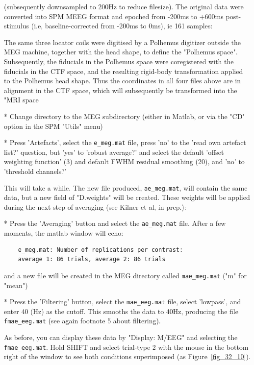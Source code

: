  (subsequently downsampled to 200Hz to reduce filesize).  The original data were converted into SPM MEEG format and epoched from -200ms to +600ms post-stimulus (i.e, baseline-corrected from -200ms to 0ms), ie 161 samples:

 The same three locator coils were digitised by a Polhemus digitizer outside the MEG machine, together with the head shape, to define the "Polhemus space". Subsequently, the fiducials in the Polhemus space were coregistered with the fiducials in the CTF space, and the resulting rigid-body transformation applied to the Polhemus head shape. Thus the coordinates in all four files above are in alignment in the CTF space, which will subsequently be transformed into the "MRI space

* Change directory to the MEG subdirectory (either in Matlab, or via the "CD" option in the SPM "Utils" menu)

* Press 'Artefacts', select the \verb!e_meg.mat! file, press 'no' to the 'read own artefact list?' question, but 'yes' to 'robust average?' and select the default 'offset weighting function' (3) and default FWHM residual smoothing (20), and 'no' to 'threshold channels?'

This will take a while. The new file produced, \verb!ae_meg.mat!, will contain the same data, but a new field of "D.weights" will be created. These weights will be applied during the next step of averaging (see Kilner et al, in prep.):

* Press the 'Averaging' button and select the \verb!ae_meg.mat! file. After a few moments, the matlab window will echo:
\begin{verbatim}
    e_meg.mat: Number of replications per contrast:
    average 1: 86 trials, average 2: 86 trials
\end{verbatim}
    and a new file will be created in the MEG directory called \verb!mae_meg.mat!    ("m" for "mean")

* Press the 'Filtering' button, select the \verb!mae_eeg.mat! file, select 'lowpass', and enter 40 (Hz) as the cutoff. This smooths the data to 40Hz, producing the file \verb!fmae_eeg.mat! (see again footnote 5 about filtering).

As before, you can display these data by "Display: M/EEG" and selecting the \verb!fmae_eeg.mat!. Hold SHIFT and select trial-type 2 with the mouse in the bottom right of the window to see both conditions superimposed (as Figure~\ref{fig_32_10}).

